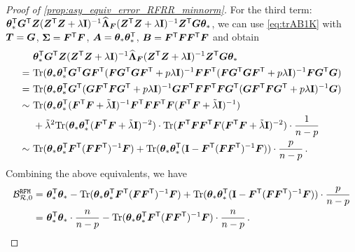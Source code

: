 \begin{proof}[Proof of \cref{prop:asy_equiv_error_RFRR_minnorm}]
For the third term: $\btheta_*^\sT \bG^\sT \bZ (\bZ^\sT \bZ + \lambda\id)^{-1} \widehat{\bLambda}_{\bF} (\bZ^\sT \bZ + \lambda\id)^{-1} \bZ^\sT \bm{G} \btheta_*$, we can use \cref{eq:trAB1K} with $\bT=\bG$, $\bSigma=\bF^\sT\bF$, $\bA=\btheta_*\btheta_*^\sT$, $\bB=\bF^\sT\bF\bF^\sT\bF$ and obtain
\[
\begin{aligned}
&~\btheta_*^\sT \bG^\sT \bZ (\bZ^\sT \bZ + \lambda\id)^{-1} \widehat{\bLambda}_{\bF} (\bZ^\sT \bZ + \lambda\id)^{-1} \bZ^\sT \bm{G} \btheta_*\\
=&~\Tr(\btheta_* \btheta_*^\sT \bG^\sT \bG \bF^\sT(\bF \bG^\sT \bG \bF^\sT + p\lambda\id)^{-1} \bF\bF^\sT (\bF \bG^\sT \bG \bF^\sT + p\lambda\id)^{-1} \bF \bG^\sT \bG )\\
=&~\Tr(\btheta_* \btheta_*^\sT \bG^\sT ( \bG \bF^\sT \bF \bG^\sT + p\lambda\id)^{-1} \bG \bF^\sT \bF\bF^\sT \bF \bG^\sT ( \bG \bF^\sT \bF \bG^\sT + p\lambda\id)^{-1} \bG )\\
\sim&~ \Tr(\btheta_* \btheta_*^\sT (\bF^\sT \bF + \tilde\lambda\id)^{-1} \bF^\sT \bF\bF^\sT \bF (\bF^\sT \bF + \tilde\lambda\id)^{-1})\\
&~+ \tilde\lambda^2 \Tr(\btheta_* \btheta_*^\sT (\bF^\sT \bF + \tilde\lambda\id)^{-2}) \cdot \Tr(\bF^\sT \bF\bF^\sT \bF (\bF^\sT \bF + \tilde\lambda\id)^{-2}) \cdot \frac{1}{n-p}\\
\sim&~ \Tr(\btheta_* \btheta_*^\sT \bF^\sT (\bF \bF^\sT)^{-1} \bF) + \Tr(\btheta_* \btheta_*^\sT (\id -\bF^\sT (\bF \bF^\sT)^{-1} \bF )) \cdot \frac{p}{n-p}\,.
\end{aligned}
\]
Combining the above equivalents, we have
\[
\begin{aligned}
\mathcal{B}^{\tt RFM}_{\mathcal{R},0} =&~ \btheta_*^\sT \btheta_* -\Tr(\btheta_* \btheta_*^\sT \bF^\sT (\bF \bF^\sT)^{-1} \bF) + \Tr(\btheta_* \btheta_*^\sT (\id -\bF^\sT (\bF \bF^\sT)^{-1} \bF )) \cdot \frac{p}{n-p}\\
=&~ \btheta_*^\sT \btheta_* \cdot \frac{n}{n-p} -\Tr(\btheta_* \btheta_*^\sT \bF^\sT (\bF \bF^\sT)^{-1} \bF) \cdot \frac{n}{n-p}\,.
\end{aligned}
\]

\end{proof}
